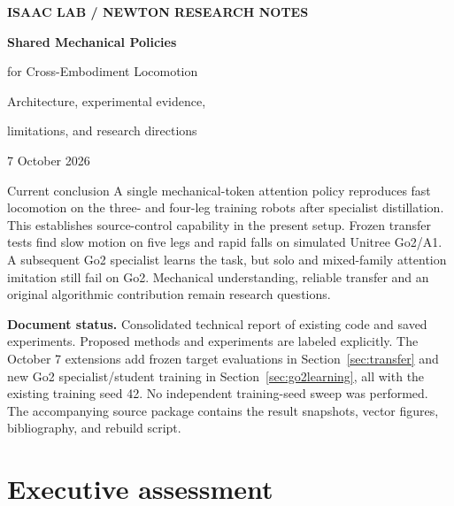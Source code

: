 \documentclass[11pt,letterpaper]{article}
\newcommand{\reportdate}{7 October 2026}
\begin{document}
\hypersetup{pageanchor=false}
\begin{titlepage}
\vspace*{14mm}
{\large\color{tealblue}\bfseries ISAAC LAB / NEWTON RESEARCH NOTES\par}
\vspace{12mm}
{\Huge\bfseries\color{ink}Shared Mechanical Policies\par}
\vspace{3mm}
{\LARGE\color{ink}for Cross-Embodiment Locomotion\par}
\vspace{9mm}
{\Large Architecture, experimental evidence,\par limitations, and research directions\par}
\vspace{12mm}
{\large\reportdate\par}
\vfill
\begin{finding}{Current conclusion}
A single mechanical-token attention policy reproduces fast locomotion on the
three- and four-leg training robots after specialist distillation. This establishes
source-control capability in the present setup. Frozen transfer tests find slow
motion on five legs and rapid falls on simulated Unitree Go2/A1. A subsequent Go2
specialist learns the task, but solo and mixed-family attention imitation still
fail on Go2. Mechanical understanding, reliable transfer and an original
algorithmic contribution remain research questions.
\end{finding}
\vspace{6mm}
\textbf{Document status.} Consolidated technical report of existing code and saved
experiments. Proposed methods and experiments are labeled explicitly.
The October 7 extensions add frozen target evaluations in
Section~\ref{sec:transfer} and new Go2 specialist/student training in
Section~\ref{sec:go2learning}, all with the existing training seed 42.
No independent training-seed sweep was performed.
The accompanying source package contains the result snapshots,
vector figures, bibliography, and rebuild script.
\end{titlepage}

\hypersetup{pageanchor=true}
\tableofcontents
\clearpage
{}

\section{Executive assessment}
\label{sec:assessment}
\end{document}
